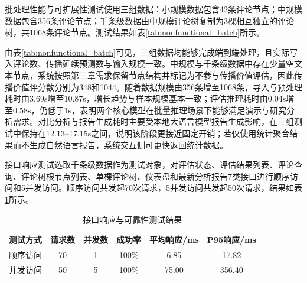 批处理性能与可扩展性测试使用三组数据：小规模数据包含42条评论节点；中规模数据包含356条评论节点；千条级数据由中规模评论树复制为3棵相互独立的评论树，共1068条评论节点。测试结果如表\ref{tab:nonfunctional_batch}所示。

\begin{table}[H]
  \centering
  \caption{批处理性能与可扩展性测试结果}
  \label{tab:nonfunctional_batch}
  \renewcommand\arraystretch{1.35}
\end{table}

由表\ref{tab:nonfunctional_batch}可见，三组数据均能够完成端到端处理，且实际写入评论数、传播延续预测数与输入规模一致。中规模与千条级数据中存在少量空文本节点，系统按照第三章需求保留节点结构并标记为不参与传播价值评估，因此传播价值评分数分别为348和1044。随着数据规模由356条增至1068条，导入与预处理耗时由3.69s增至10.87s，增长趋势与样本规模基本一致；评估推理耗时由0.04s增至0.58s，仍低于1s，表明两个核心模型在批量推理场景下能够满足演示与研究分析需求。对比分析与报告生成耗时主要受本地大语言模型报告生成影响，在三组测试中保持在12.13--17.15s之间，说明该阶段更接近固定开销；若仅使用统计聚合结果而不生成自然语言报告，系统交互侧可更快返回统计数据。

接口响应测试选取千条级数据作为测试对象，对评估状态、评估结果列表、评论查询、评论树根节点列表、单棵评论树、仪表盘和最新分析报告7类接口进行顺序访问和5并发访问。顺序访问共发起70次请求，5并发访问共发起50次请求，结果如表\ref{tab:nonfunctional_api}所示。

\begin{table}[H]
  \centering
  \caption{接口响应与可靠性测试结果}
  \label{tab:nonfunctional_api}
  \renewcommand\arraystretch{1.35}
  \begin{tabular}{cccccc}
    \toprule
    测试方式 & 请求数 & 并发数 & 成功率 & 平均响应/ms & P95响应/ms \\
    \midrule
    顺序访问 & 70 & 1 & 100\% & 6.85 & 17.82 \\
    并发访问 & 50 & 5 & 100\% & 75.00 & 356.40 \\
    \bottomrule
  \end{tabular}
\end{table}

